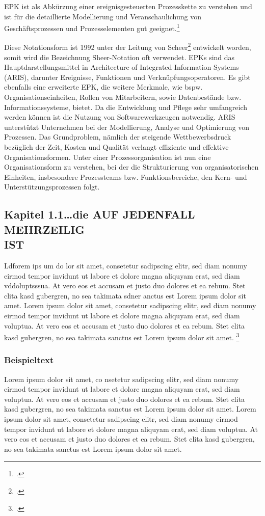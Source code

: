 EPK ist als Abkürzung einer ereignisgesteuerten Prozesskette zu verstehen und
ist für die detaillierte Modellierung und Veranschaulichung
von Geschäftsprozessen und Prozesselementen gut
geeignet.\footcite[Vgl.][]{lehmann}
 

Diese Notationsform ist 1992 unter der Leitung von
Scheer\footcite[Vgl.][]{scheer} entwickelt worden, somit wird die Bezeichnung
Sheer-Notation oft verwendet.
EPKs sind das Hauptdarstellungsmittel in Architecture of Integrated 
Information Systems (ARIS), darunter Ereignisse, 
Funktionen und Verknüpfungsoperatoren. Es gibt ebenfalls eine erweiterte EPK, 
die weitere Merkmale, wie bspw. Organisationseinheiten, Rollen von Mitarbeitern, 
sowie Datenbestände bzw. Informationssysteme, bietet. 
Da die Entwicklung und Pflege sehr umfangreich werden können ist die 
Nutzung von Softwarewerkzeugen notwendig. 
ARIS unterstützt Unternehmen bei der Modellierung, Analyse und Optimierung von Prozessen.
Das Grundproblem, nämlich der steigende Wettbewerbsdruck bezüglich der Zeit, 
Kosten und Qualität verlangt effiziente und effektive Organisationsformen. 
Unter einer Prozessorganisation ist nun eine Organisationsform zu verstehen, 
bei der die Strukturierung von organisatorischen Einheiten, 
insbesondere  Prozessteams bzw. Funktionsbereiche, 
den Kern- und Unterstützungsprozessen folgt.






\subsection{Kapitel 1.1\ldots die AUF JEDENFALL MEHRZEILIG\\IST}

Ldforem ips um do lor sit amet, consetetur sadipscing elitr, \label{Referenz}
sed diam  nonumy eirmod tempor invidunt ut labore et dolore magna aliquyam erat,
sed diam vddoluptsssua. At vero eos et accusam et justo duo dolores et ea rebum.
Stet clita kasd gubergren, no sea takimata sdner anctus est Lorem ipsum dolor sit amet. Lorem ipsum dolor sit amet, consetetur sadipscing elitr, sed diam nonumy eirmod tempor invidunt ut labore et dolore magna aliquyam erat, sed diam voluptua. At vero eos et accusam et justo duo dolores et ea rebum. Stet clita kasd gubergren, no sea takimata sanctus est Lorem ipsum dolor sit amet.
\footcite[Vgl.][Experto.de, Artikel über das und jenes]{praxishandbuch:bpmn2}
\subsubsection{Beispieltext}
Lorem ipsum dolor sit amet, co nsetetur sadipscing elitr, sed diam
nonumy eirmod tempor invidunt ut labore et dolore magna aliquyam erat, sed diam voluptua. At vero eos et accusam et justo duo dolores et ea rebum. Stet clita kasd gubergren, no sea takimata sanctus est Lorem ipsum dolor sit amet. Lorem ipsum dolor sit amet, consetetur sadipscing elitr, sed diam nonumy eirmod tempor invidunt ut labore et dolore magna aliquyam erat, sed diam voluptua. At vero eos et accusam et justo duo dolores et ea rebum. Stet clita kasd gubergren, no sea takimata sanctus est Lorem ipsum dolor sit amet.

